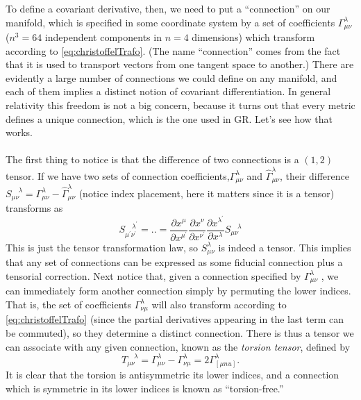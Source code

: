 To define a covariant derivative, then, we need to put a “connection” on our manifold,
which is specified in some coordinate system by a set of coefficients $Γ^\lambda_{\mu \nu}$ ($n^3 = 64$ independent
components in $n = 4$ dimensions) which transform according to \ref{eq:christoffelTrafo}. (The name “connection” comes from the fact that it is used to transport vectors from one tangent space to
another.) There are evidently a large number of connections we could
define on any manifold, and each of them implies a distinct notion of covariant differentiation. In general relativity this freedom is not a big concern, because it turns out that every
metric defines a unique connection, which is the one used in GR. Let’s see how that works.\\
\\
The first thing to notice is that the difference of two connections is a $(1, 2)$ tensor. If
we have two sets of connection coefficients,$ Γ^{\lambda}_{μν}$ and $\hat{\Gamma}^\lambda_{\mu \nu}$, their difference $S^{\quad \lambda}_{\mu \nu} = \Gamma^\lambda_{\mu \nu} - \hat{\Gamma}^\lambda_{\mu \nu}$ (notice index placement, here it matters since it is a tensor) transforms as
\begin{equation}
S^{\quad \lambda^\prime}_{\mu^\prime \nu^\prime} =..= \frac{\partial x^\mu}{\partial x^{\mu^\prime}} \frac{\partial x^\nu}{\partial x^{\nu^\prime}} \frac{\partial x^{\lambda^\prime}}{\partial x^\lambda} S^{\quad \lambda}_{\mu \nu}
\end{equation}
This is just the tensor transformation law, so $S^\lambda_{\mu \nu}$ is indeed a tensor. This implies that any
set of connections can be expressed as some fiducial connection plus a tensorial correction.
Next notice that, given a connection specified by $Γ^λ_{μν}$ , we can immediately form another
connection simply by permuting the lower indices. That is, the set of coefficients $Γ^λ_{νμ}$ will
also transform according to \ref{eq:christoffelTrafo} (since the partial derivatives appearing in the last term
can be commuted), so they determine a distinct connection. There is thus a tensor we can
associate with any given connection, known as the \emph{torsion tensor}, defined by
\begin{equation}
	T^{\quad \lambda}_{\mu \nu} = \Gamma^\lambda_{\mu \nu} - \Gamma^\lambda_{\nu \mu} = 2 \Gamma^\lambda_{[\mu nu]}.
\end{equation}
It is clear that the torsion is antisymmetric its lower indices, and a connection which is
symmetric in its lower indices is known as “torsion-free.”\\
